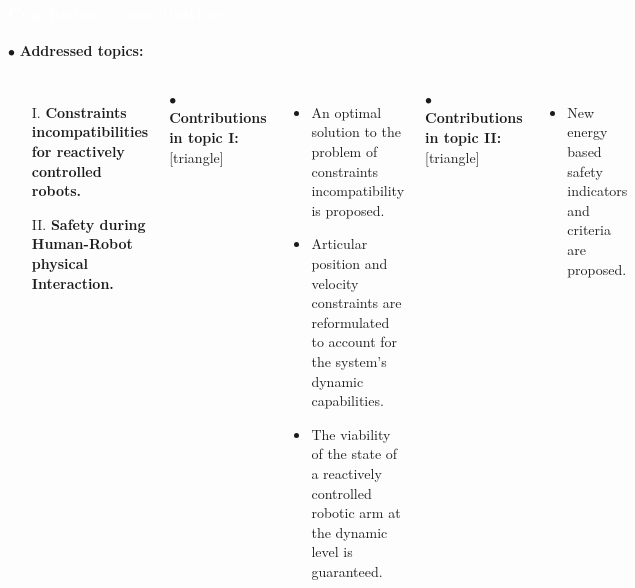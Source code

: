 \begin{frame}[noframenumbering]
\frametitle{{\textcolor{white}{\hspace{0.3cm}Conclusion -- contributions}}}


\hspace{-6mm}
$\bullet$ {\color{blue-violet}\textbf{Addressed topics:}}
\begin{columns}
\column{\paperwidth-10mm}
\begin{itemize}
\item[I.]  {\color{red}\textbf{Constraints incompatibilities for reactively controlled robots.}}
\item[II.] {\color{red}\textbf{Safety during Human-Robot physical Interaction.}}
\end{itemize}
\vspace{5mm}

$\bullet$ {\color{ao(english)}\textbf{Contributions in topic I:}}
[triangle] 
\begin{itemize}
\item An optimal solution to the problem of constraints incompatibility is proposed.

\item Articular position and velocity constraints are reformulated to account for the system's dynamic capabilities.

\item The viability of the state of a reactively controlled robotic arm at the dynamic level is guaranteed.

\end{itemize}
\vspace{5mm}

$\bullet$ {\color{ao(english)}\textbf{Contributions in topic II:}}
[triangle] 
\begin{itemize}
\item New energy based safety indicators and criteria are proposed.


\end{itemize}
\end{columns}
\end{frame}













